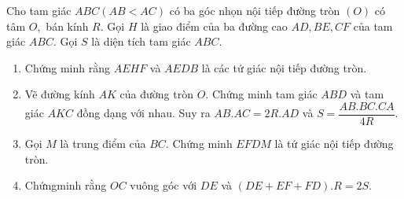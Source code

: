 \begin{vd}%
	Cho tam giác $ABC\left(AB<AC\right)$ có ba góc nhọn nội tiếp đường tròn $(O)$ có tâm $O,$ bán kính $R.$ Gọi $H$ là giao điểm của ba đường cao $AD,BE,CF$ của tam giác $ABC.$ Gọi $S$ là diện tích tam giác $ABC.$ 
	\begin{enumerate}
		\item Chứng minh rằng $AEHF$ và $AEDB$ là các tứ giác nội tiếp đường tròn.
		\item Vẽ đường kính $AK$ của đường tròn $O.$ Chứng minh tam giác $ABD$ và tam giác $AKC$ đồng dạng với nhau. Suy ra $AB.AC=2R.AD$ và $S =\dfrac{AB.BC.CA}{4R}$.
		\item Gọi $M$ là trung điểm của $BC.$ Chứng minh $EFDM$ là tứ giác nội tiếp đường tròn.
		\item Chứngminh rằng $OC$ vuông góc với $DE$ và $\left(DE+EF+FD\right).R=2S.$ 
	\end{enumerate}
	

\end{vd}
